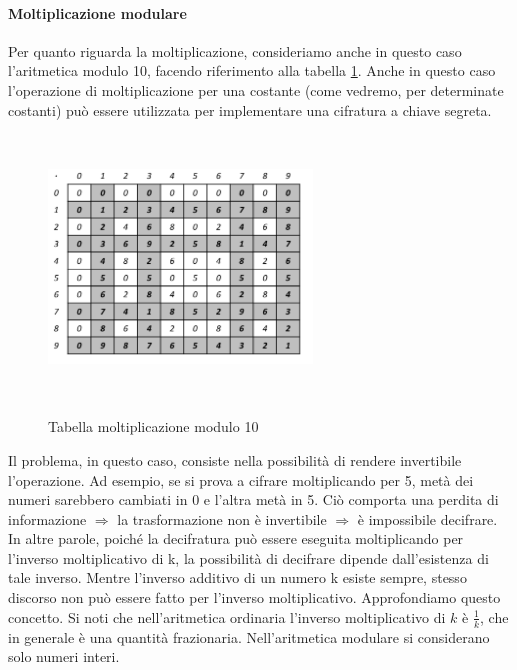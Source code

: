 \paragraph{Moltiplicazione modulare}
Per quanto riguarda la moltiplicazione, consideriamo anche in questo caso l'aritmetica modulo 10, facendo riferimento alla tabella \ref{fig:molt_mod}. Anche in questo caso l'operazione di moltiplicazione per una costante (come vedremo, per determinate costanti) può essere utilizzata per implementare una cifratura a chiave segreta.
\begin{figure}[htbp]
	\centering%
	\subfigure%
	{\includegraphics[height=7cm, width=7cm, keepaspectratio]{Immagini/chiave_pubblica/molt_mod.png}}
	\caption{Tabella moltiplicazione modulo 10 \label{fig:molt_mod}} 	
\end{figure}
Il problema, in questo caso, consiste nella possibilità di rendere invertibile l'operazione. Ad esempio, se si prova a cifrare moltiplicando per 5, metà dei numeri sarebbero cambiati in 0 e l'altra metà in 5. Ciò comporta una perdita di informazione $\Rightarrow$ la trasformazione non è invertibile $\Rightarrow$ è impossibile decifrare.
\newline \newline
In altre parole, poiché la decifratura può essere eseguita moltiplicando per l'inverso moltiplicativo di k, la possibilità di decifrare dipende dall'esistenza di tale inverso. Mentre l'inverso additivo di un numero k esiste sempre, stesso discorso non può essere fatto per l'inverso moltiplicativo. Approfondiamo questo concetto. 
\newline \newline
Si noti che nell’aritmetica ordinaria l'inverso moltiplicativo di $k$ è $\frac{1}{k}$, che in generale è una quantità frazionaria. Nell'aritmetica modulare si considerano solo numeri interi.

